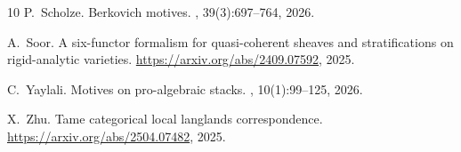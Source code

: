 \documentclass[14pt]{article}
\theoremstyle{definition}
\numberwithin{subsection}{section}
\begin{document}
\begin{thebibliography}{10}
P.~Scholze.
\newblock Berkovich motives.
, 39(3):697--764, 2026.

A.~Soor.
\newblock A six-functor formalism for quasi-coherent sheaves and
  stratifications on rigid-analytic varieties.
\newblock \url{https://arxiv.org/abs/2409.07592}, 2025.

C.~Yaylali.
\newblock Motives on pro-algebraic stacks.
, 10(1):99–125, 2026.

X.~Zhu.
\newblock Tame categorical local langlands correspondence.
\newblock \url{https://arxiv.org/abs/2504.07482}, 2025.

\end{thebibliography}
\end{document}
